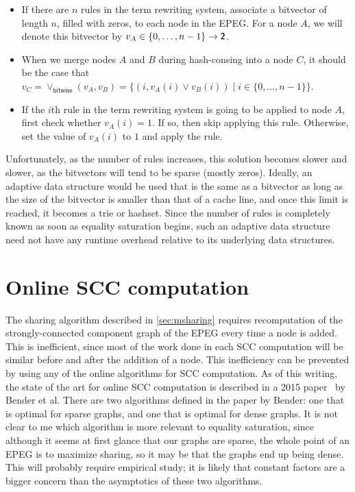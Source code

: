 \documentclass[11pt]{report}
\newcommand{\textbs}[1]{{\sffamily\fontseries{sbc}\selectfont #1}}
\newcommand{\mathbs}[1]{\ensuremath{\text{\textbs{#1}}}}
\newcommand{\mbs}[1]{\ensuremath{\mathbs{#1}}}     %
\newcommand{\msf}[1]{\ensuremath{\mathsf{#1}}}     %
\begin{document}
\begin{itemize}
\item {%
  If there are $n$ rules in the term rewriting system, associate a bitvector of
  length $n$, filled with zeros, to each node in the EPEG. For a node $A$, we
  will denote this bitvector by $v_A \in \{0, \ldots, n - 1\} \to \mbs{2}$.
}
\item {%
  When we merge nodes $A$ and $B$ during hash-consing into a node $C$, it should
  be the case that
  $ v_C
  = {\lor}_\msf{bitwise}(v_A, v_B)
  = \{(i, v_A(i) \lor v_B(i)) \mid i \in \{0, \ldots, n - 1\}\}$.
}
\item {%
  If the $i$th rule in the term rewriting system is going to be applied to
  node $A$, first check whether $v_A(i) = 1$. If so, then skip applying this
  rule. Otherwise, set the value of $v_A(i)$ to $1$ and apply the rule.
}
\end{itemize}

Unfortunately, as the number of rules increases, this solution becomes slower
and slower, as the bitvectors will tend to be sparse (mostly zeros). Ideally,
an adaptive data structure would be used that is the same as a bitvector as
long as the size of the bitvector is smaller than that of a cache line, and once
this limit is reached, it becomes a trie or hashset. Since the number of rules
is completely known as soon as equality saturation begins, such an adaptive data
structure need not have any runtime overhead relative to its underlying data
structures.

\section{Online SCC computation}
\label{sec:online-scc}

The sharing algorithm described in \autoref{sec:msharing} requires recomputation
of the strongly-connected component graph of the EPEG every time a node is
added. This is inefficient, since most of the work done in each SCC computation
will be similar before and after the addition of a node. This inefficiency can
be prevented by using any of the online algorithms for SCC computation. As of
this writing, the state of the art for online SCC computation is described in
a 2015 paper~\cite{bender-2015} by Bender et al. There are two algorithms
defined in the paper by Bender: one that is optimal for sparse graphs, and one
that is optimal for dense graphs. It is not clear to me which algorithm is more
relevant to equality saturation, since although it seems at first glance that
our graphs are sparse, the whole point of an EPEG is to maximize sharing, so
it may be that the graphs end up being dense. This will probably require
empirical study; it is likely that constant factors are a bigger concern than
the asymptotics of these two algorithms.
\end{document}
